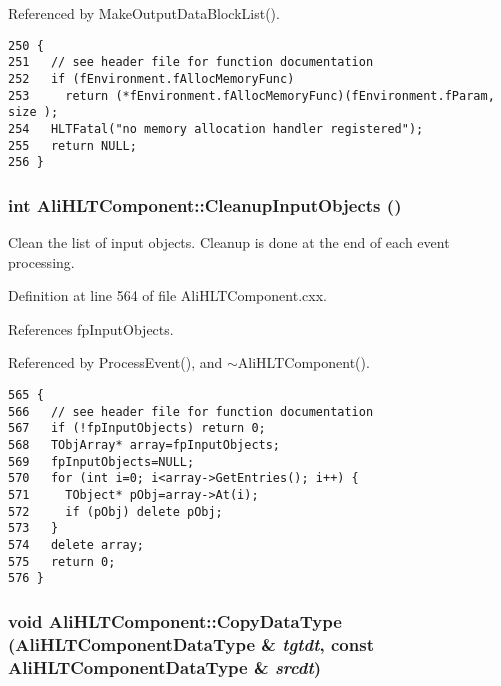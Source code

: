 Referenced by Make\-Output\-Data\-Block\-List().

\footnotesize\begin{verbatim}250 {
251   // see header file for function documentation
252   if (fEnvironment.fAllocMemoryFunc)
253     return (*fEnvironment.fAllocMemoryFunc)(fEnvironment.fParam, size );
254   HLTFatal("no memory allocation handler registered");
255   return NULL;
256 }
\end{verbatim}\normalsize 


\subsubsection{\setlength{\rightskip}{0pt plus 5cm}int Ali\-HLTComponent::Cleanup\-Input\-Objects ()\hspace{0.3cm}{\tt  [private]}}\label{classAliHLTComponent_d5}


Clean the list of input objects. Cleanup is done at the end of each event processing. 

Definition at line 564 of file Ali\-HLTComponent.cxx.

References fp\-Input\-Objects.

Referenced by Process\-Event(), and $\sim$Ali\-HLTComponent().

\footnotesize\begin{verbatim}565 {
566   // see header file for function documentation
567   if (!fpInputObjects) return 0;
568   TObjArray* array=fpInputObjects;
569   fpInputObjects=NULL;
570   for (int i=0; i<array->GetEntries(); i++) {
571     TObject* pObj=array->At(i);
572     if (pObj) delete pObj;
573   }
574   delete array;
575   return 0;
576 }
\end{verbatim}\normalsize 


\subsubsection{\setlength{\rightskip}{0pt plus 5cm}void Ali\-HLTComponent::Copy\-Data\-Type ({\bf Ali\-HLTComponent\-Data\-Type} \& {\em tgtdt}, const {\bf Ali\-HLTComponent\-Data\-Type} \& {\em srcdt})\hspace{0.3cm}{\tt  [protected]}}\label{classAliHLTComponent_b3}


